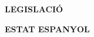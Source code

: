 \documentclass[12pt]{article}
\begin{document}
\vspace{\baselineskip}

\vspace{\baselineskip}

\vspace{\baselineskip}

\vspace{\baselineskip}

\vspace{\baselineskip}

\vspace{\baselineskip}

\vspace{\baselineskip}

\vspace{\baselineskip}

\vspace{\baselineskip}

\vspace{\baselineskip}

\vspace{\baselineskip}

\vspace{\baselineskip}

\vspace{\baselineskip}

\vspace{\baselineskip}

\vspace{\baselineskip}
\begin{Center}
{\fontsize{16pt}{19.2pt}\selectfont \textbf{LEGISLACIÓ}\par}
\end{Center}\par


\vspace{\baselineskip}

\vspace{\baselineskip}

\vspace{\baselineskip}
\begin{justify}
\textbf{ESTAT ESPANYOL}
\end{justify}\par
\end{document}
